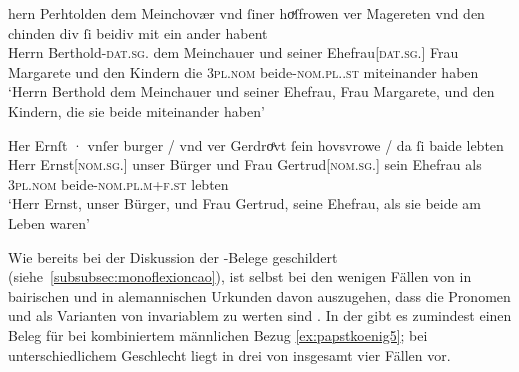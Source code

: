 \begin{exe}
\ex \label{ex:m+f_si_beide_iu}
	\begin{xlist}
	\ex \label{ex:m+f_si_beidiu}
		\gll hern Perhtolden dem Meinchovær vnd ſiner hoͮſfrowen ver
				Magereten vnd den chinden div ſi beidiv {mit
				ein ander} habent \\
			Herrn Berthold-\textsc{dat.sg.\MascM} dem Meinchauer und seiner
				Ehefrau[\textsc{dat.sg.\FemF}] Frau Margarete und den Kindern
				die \textsc{3pl\subMF.nom} beide-\textsc{nom.pl.\NeutMF.st}
				miteinander haben \\
		\trans `Herrn Berthold dem Meinchauer und seiner Ehefrau, Frau
			Margarete, und den Kindern, die sie beide miteinander haben'
			\parencites(Nr.~937, Regensburg, 1287)[292,40--41]{cao2}

	\ex \label{ex:m+f_si_beide}
		\gll Her Ernſt · vnſer burger / vnd ver Gerdroͤvt ſein
				hovsvrowe / da ſi baide lebten \\
			Herr Ernst[\textsc{nom.sg.\MascM}] {} unser Bürger {} und Frau
				Gertrud[\textsc{nom.sg.\FemF}] sein Ehefrau {} als
				\textsc{3pl\subMF.nom} beide-\textsc{nom.pl.m+f\subMF.st}
				lebten \\
		\trans `Herr Ernst, unser Bürger, und Frau Gertrud, seine Ehefrau,
			als sie beide am Leben waren'
			\parencites(Nr.~1073, Wien, 1289)[374,40--41]{cao2}
	\end{xlist}
\end{exe}

Wie bereits bei der Diskussion der \CAO{}-Belege geschildert
(siehe~\cref{subsubsec:monoflexioncao}), ist selbst bei den wenigen Fällen von
 in bairischen und  in alemannischen Urkunden
davon auszugehen, dass die Pronomen  und  als Varianten von
invariablem  zu werten sind \autocite[vgl.][394--396]{ksw2}. In der
\KC{} gibt es zumindest einen Beleg für  bei kombiniertem
männlichen Bezug \cref{ex:papstkoenig5}; bei unterschiedlichem Geschlecht liegt
 in drei von insgesamt vier Fällen vor.

